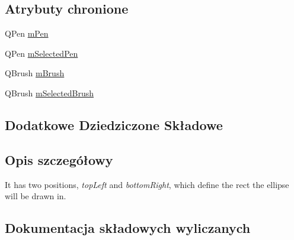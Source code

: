\subsection*{Atrybuty chronione}
\begin{DoxyCompactItemize}
\item 
Q\+Pen \hyperlink{class_q_c_p_item_ellipse_a16ad9389acf028a7e4ac8fd7a550b2e4}{m\+Pen}
\item 
Q\+Pen \hyperlink{class_q_c_p_item_ellipse_a57b047abfce6f1a84ed46ca668c90e21}{m\+Selected\+Pen}
\item 
Q\+Brush \hyperlink{class_q_c_p_item_ellipse_a6fa59478cd3ad1b10e6c1f6cedc84bd6}{m\+Brush}
\item 
Q\+Brush \hyperlink{class_q_c_p_item_ellipse_a2e49d5547478aa36910ed8a2dcc8a5c0}{m\+Selected\+Brush}
\end{DoxyCompactItemize}
\subsection*{Dodatkowe Dziedziczone Składowe}


\subsection{Opis szczegółowy}
 It has two positions, {\itshape top\+Left} and {\itshape bottom\+Right}, which define the rect the ellipse will be drawn in. 

\subsection{Dokumentacja składowych wyliczanych}
